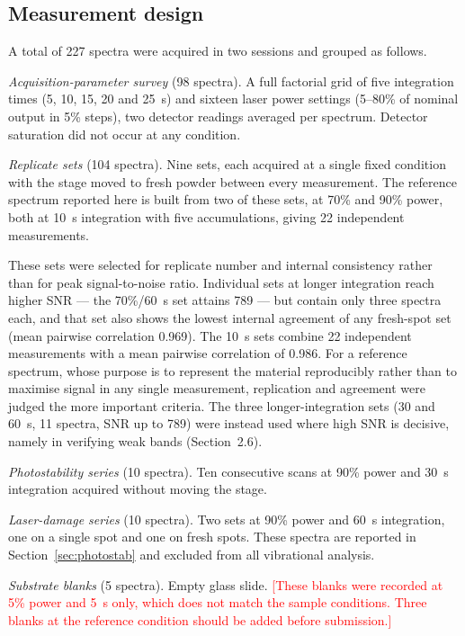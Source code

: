\documentclass[preprint,12pt]{elsarticle}
\newcommand{\authorcheck}[1]{\textcolor{red}{[#1]}}
\begin{document}
\subsection{Measurement design}

A total of 227 spectra were acquired in two sessions and grouped as follows.

\emph{Acquisition-parameter survey} (98 spectra). A full factorial grid of five
integration times (5, 10, 15, 20 and 25~s) and sixteen laser power settings
(5--80\% of nominal output in 5\% steps), two detector readings averaged per
spectrum. Detector saturation did not occur at any condition.

\emph{Replicate sets} (104 spectra). Nine sets, each acquired at a single fixed
condition with the stage moved to fresh powder between every measurement. The
reference spectrum reported here is built from two of these sets, at 70\% and
90\% power, both at 10~s integration with five accumulations, giving 22
independent measurements.

These sets were selected for replicate number and internal consistency rather
than for peak signal-to-noise ratio. Individual sets at longer integration reach
higher SNR --- the 70\%/60~s set attains 789 --- but contain only three spectra
each, and that set also shows the lowest internal agreement of any fresh-spot
set (mean pairwise correlation 0.969). The 10~s sets combine 22 independent
measurements with a mean pairwise correlation of 0.986. For a reference spectrum,
whose purpose is to represent the material reproducibly rather than to maximise
signal in any single measurement, replication and agreement were judged the more
important criteria. The three longer-integration sets (30 and 60~s, 11 spectra,
SNR up to 789) were instead used where high SNR is decisive, namely in verifying
weak bands (Section~2.6).

\emph{Photostability series} (10 spectra). Ten consecutive scans at 90\% power
and 30~s integration acquired without moving the stage.

\emph{Laser-damage series} (10 spectra). Two sets at 90\% power and 60~s
integration, one on a single spot and one on fresh spots. These spectra are
reported in Section~\ref{sec:photostab} and excluded from all vibrational
analysis.

\emph{Substrate blanks} (5 spectra). Empty glass slide.
\authorcheck{These blanks were recorded at 5\% power and 5~s only, which does
not match the sample conditions. Three blanks at the reference condition should
be added before submission.}
\end{document}
